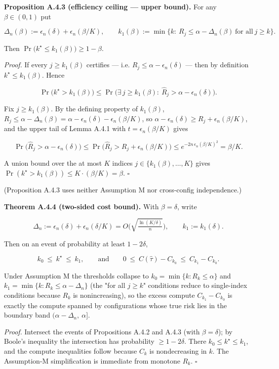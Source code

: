 \documentclass{ieeeaccess}
\begin{document}
\textbf{Proposition A.4.3 (efficiency ceiling --- upper bound).} For any $\beta\in(0,1)$ put

\[
\Delta_n(\beta):=\epsilon_n(\delta)+\epsilon_n(\beta/K),\qquad
k_1(\beta):=\min\{k:\ R_j\le\alpha-\Delta_n(\beta)\ \text{for all}\ j\ge k\}.
\]

Then $\Pr\big(k^\star\le k_1(\beta)\big)\ge1-\beta$.

\emph{Proof.} If every $j\ge k_1(\beta)$ certifies --- i.e. $\hat R_j\le\alpha-\epsilon_n(\delta)$ --- then by definition $k^\star\le k_1(\beta)$. Hence

\[
\Pr\big(k^\star> k_1(\beta)\big)\le\Pr\Big(\exists\,j\ge k_1(\beta):\ \hat R_j>\alpha-\epsilon_n(\delta)\Big).
\]

Fix $j\ge k_1(\beta)$. By the defining property of $k_1(\beta)$, $R_j\le\alpha-\Delta_n(\beta)=\alpha-\epsilon_n(\delta)-\epsilon_n(\beta/K)$, so $\alpha-\epsilon_n(\delta)\ge R_j+\epsilon_n(\beta/K)$, and the upper tail of Lemma A.4.1 with $t=\epsilon_n(\beta/K)$ gives

\[
\Pr\big(\hat R_j>\alpha-\epsilon_n(\delta)\big)\le\Pr\big(\hat R_j>R_j+\epsilon_n(\beta/K)\big)\le e^{-2n\,\epsilon_n(\beta/K)^2}=\beta/K .
\]

A union bound over the at most $K$ indices $j\in\{k_1(\beta),\dots,K\}$ gives $\Pr(k^\star> k_1(\beta))\le K\cdot(\beta/K)=\beta$. $\square$

(Proposition A.4.3 uses neither Assumption M nor cross-config independence.)

\textbf{Theorem A.4.4 (two-sided cost bound).} With $\beta=\delta$, write

\[
\Delta_n:=\epsilon_n(\delta)+\epsilon_n(\delta/K)=O\!\Big(\sqrt{\tfrac{\ln(K/\delta)}{n}}\Big),\qquad k_1:=k_1(\delta).
\]

Then on an event of probability at least $1-2\delta$,

\[
k_0\ \le\ k^\star\ \le\ k_1,\qquad\text{and}\qquad 0\ \le\ C(\hat\tau)-C_{k_0}\ \le\ C_{k_1}-C_{k_0}.
\]

Under Assumption M the thresholds collapse to $k_0=\min\{k:R_k\le\alpha\}$ and $k_1=\min\{k:R_k\le\alpha-\Delta_n\}$ (the "for all $j\ge k$" conditions reduce to single-index conditions because $R_k$ is nonincreasing), so the excess compute $C_{k_1}-C_{k_0}$ is exactly the compute spanned by configurations whose true risk lies in the boundary band $(\alpha-\Delta_n,\ \alpha]$.

\emph{Proof.} Intersect the events of Propositions A.4.2 and A.4.3 (with $\beta=\delta$); by Boole's inequality the intersection has probability $\ge1-2\delta$. There $k_0\le k^\star\le k_1$, and the compute inequalities follow because $C_k$ is nondecreasing in $k$. The Assumption-M simplification is immediate from monotone $R_k$. $\square$
\end{document}
